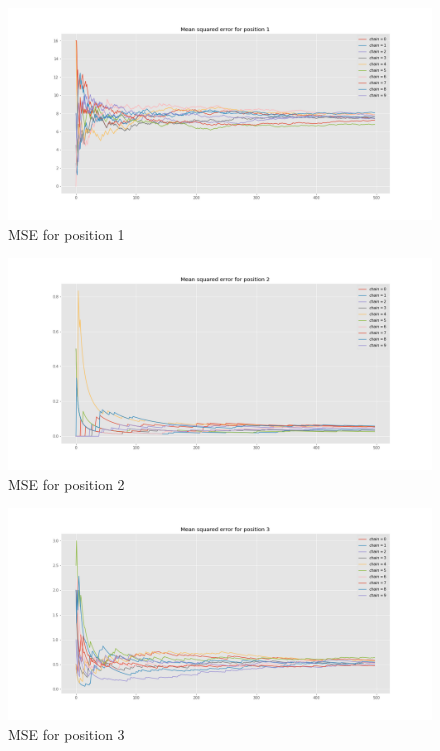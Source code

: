 \documentclass[]{article}
\begin{document}
\begin{figure}[H]
	\begin{center}
		
		\includegraphics[width=1\textwidth]{task4/figures/T_2_4/Q2/mse_pos1.png}
		\caption*{MSE for position 1}
	\end{center}
\end{figure}

\begin{figure}[H]
	\begin{center}
		
		\includegraphics[width=1\textwidth]{task4/figures/T_2_4/Q2/mse_pos2.png}
		\caption*{MSE for position 2}
	\end{center}
\end{figure}

\begin{figure}[H]
	\begin{center}
		
		\includegraphics[width=1\textwidth]{task4/figures/T_2_4/Q2/mse_pos3.png}
		\caption*{MSE for position 3}
	\end{center}
\end{figure}
\end{document}
